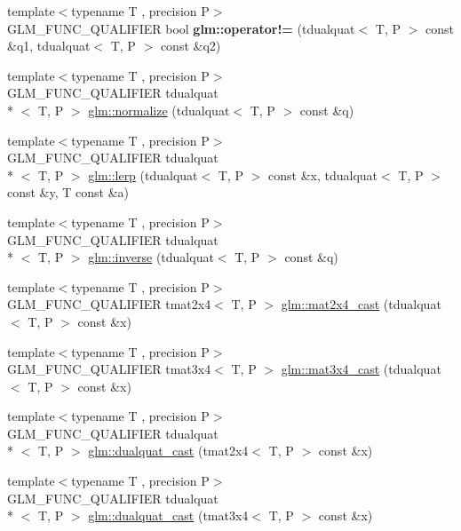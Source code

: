 \begin{DoxyCompactItemize}
\item 
\hypertarget{namespaceglm_a7720bbb7f60c8f0780ddd38e2f651331}{{\footnotesize template$<$typename T , precision P$>$ }\\G\-L\-M\-\_\-\-F\-U\-N\-C\-\_\-\-Q\-U\-A\-L\-I\-F\-I\-E\-R bool {\bfseries glm\-::operator!=} (tdualquat$<$ T, P $>$ const \&q1, tdualquat$<$ T, P $>$ const \&q2)}\label{namespaceglm_a7720bbb7f60c8f0780ddd38e2f651331}

\item 
{\footnotesize template$<$typename T , precision P$>$ }\\G\-L\-M\-\_\-\-F\-U\-N\-C\-\_\-\-Q\-U\-A\-L\-I\-F\-I\-E\-R tdualquat\\*
$<$ T, P $>$ \hyperlink{group__gtx__dual__quaternion_ga495818aa48c23e9e730f87a3c337d1d5}{glm\-::normalize} (tdualquat$<$ T, P $>$ const \&q)
\item 
{\footnotesize template$<$typename T , precision P$>$ }\\G\-L\-M\-\_\-\-F\-U\-N\-C\-\_\-\-Q\-U\-A\-L\-I\-F\-I\-E\-R tdualquat\\*
$<$ T, P $>$ \hyperlink{group__gtx__dual__quaternion_ga8039b88397ca09275be924a26a806a59}{glm\-::lerp} (tdualquat$<$ T, P $>$ const \&x, tdualquat$<$ T, P $>$ const \&y, T const \&a)
\item 
{\footnotesize template$<$typename T , precision P$>$ }\\G\-L\-M\-\_\-\-F\-U\-N\-C\-\_\-\-Q\-U\-A\-L\-I\-F\-I\-E\-R tdualquat\\*
$<$ T, P $>$ \hyperlink{group__gtx__dual__quaternion_ga2149d3cb8af04d9530de0cd16aa1aab2}{glm\-::inverse} (tdualquat$<$ T, P $>$ const \&q)
\item 
{\footnotesize template$<$typename T , precision P$>$ }\\G\-L\-M\-\_\-\-F\-U\-N\-C\-\_\-\-Q\-U\-A\-L\-I\-F\-I\-E\-R tmat2x4$<$ T, P $>$ \hyperlink{group__gtx__dual__quaternion_ga2d124748183e12db8288eeaca350298e}{glm\-::mat2x4\-\_\-cast} (tdualquat$<$ T, P $>$ const \&x)
\item 
{\footnotesize template$<$typename T , precision P$>$ }\\G\-L\-M\-\_\-\-F\-U\-N\-C\-\_\-\-Q\-U\-A\-L\-I\-F\-I\-E\-R tmat3x4$<$ T, P $>$ \hyperlink{group__gtx__dual__quaternion_ga576745d979e3c079a64152490c816954}{glm\-::mat3x4\-\_\-cast} (tdualquat$<$ T, P $>$ const \&x)
\item 
{\footnotesize template$<$typename T , precision P$>$ }\\G\-L\-M\-\_\-\-F\-U\-N\-C\-\_\-\-Q\-U\-A\-L\-I\-F\-I\-E\-R tdualquat\\*
$<$ T, P $>$ \hyperlink{group__gtx__dual__quaternion_gada9799afe2b62394dc498534beb5bc78}{glm\-::dualquat\-\_\-cast} (tmat2x4$<$ T, P $>$ const \&x)
\item 
{\footnotesize template$<$typename T , precision P$>$ }\\G\-L\-M\-\_\-\-F\-U\-N\-C\-\_\-\-Q\-U\-A\-L\-I\-F\-I\-E\-R tdualquat\\*
$<$ T, P $>$ \hyperlink{group__gtx__dual__quaternion_ga20eb5758beb73cc6dbc2d9104f03ec20}{glm\-::dualquat\-\_\-cast} (tmat3x4$<$ T, P $>$ const \&x)
\end{DoxyCompactItemize}


